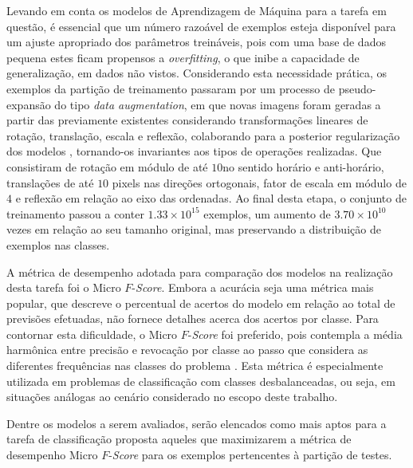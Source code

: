Levando em conta os modelos de Aprendizagem de Máquina para a tarefa em questão, é essencial que um número razoável de exemplos esteja disponível para um ajuste apropriado dos parâmetros treináveis, pois com uma base de dados pequena estes ficam propensos a \textit{overfitting}, o que inibe a capacidade de generalização, em dados não vistos\cite{DBLP:journals/corr/abs-1708-06020}. Considerando esta necessidade prática, os exemplos da partição de treinamento passaram por um processo de pseudo-expansão do tipo \emph{data augmentation}, em que novas imagens foram geradas a partir das previamente existentes considerando transformações lineares de rotação, translação, escala e reflexão, colaborando para a posterior regularização dos modelos \cite{Chollet:Livro}, tornando-os invariantes aos tipos de operações realizadas\cite{DBLP:journals/corr/abs-1708-06020}. Que consistiram de rotação em módulo de até $10$\textordmasculine no sentido horário e anti-horário, translações de até $10$ pixels nas direções ortogonais, fator de escala em módulo de $4$ e reflexão em relação ao eixo das ordenadas. Ao final desta etapa, o conjunto de treinamento passou a conter $1.33\times10^{15}$ exemplos, um aumento de $3.70\times10^{10}$ vezes em relação ao seu tamanho original, mas preservando a distribuição de exemplos nas classes.

A métrica de desempenho adotada para comparação dos modelos na realização desta tarefa foi o Micro $F$-\emph{Score}. Embora a acurácia seja uma métrica mais popular, que descreve o percentual de acertos do modelo em relação ao total de previsões efetuadas, não fornece detalhes acerca dos acertos por classe. Para contornar esta dificuldade, o Micro $F$-\emph{Score} foi preferido, pois contempla a média harmônica entre precisão e revocação por classe ao passo que considera as diferentes frequências nas classes do problema \cite{Kubat:Livro}. Esta métrica é especialmente utilizada em problemas de classificação com classes desbalanceadas, ou seja, em situações análogas ao cenário considerado no escopo deste trabalho.

Dentre os modelos a serem avaliados, serão elencados como mais aptos para a tarefa de classificação proposta aqueles que maximizarem a métrica de desempenho Micro $F$-\emph{Score}  para os exemplos pertencentes à partição de testes.
